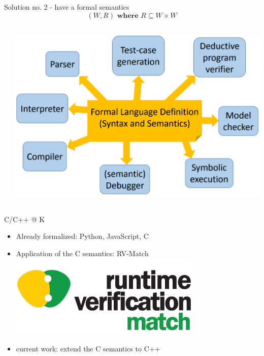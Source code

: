 \documentclass[11pt]{beamer}
\begin{document}
\begin{frame}{Solution no. 2 - have a formal semantics}
\pause
$$ \left( W, R \right) \textbf{ where } R \subseteq W \times W $$
\begin{columns}

\begin{column}{0.5\textwidth}
\end{column}

\begin{column}{0.5\textwidth}
\pause
\includegraphics[width=1.0\linewidth]{img/kidea.png}
\end{column}

\end{columns}
\end{frame}

\begin{frame}{C/C++ @ K}
\begin{itemize}
\item Already formalized: Python, JavaScript, C
\pause \item Application of the C semantics: RV-Match \\
\includegraphics[width=0.3\linewidth]{img/rvmatch.png}
\pause \item current work: extend the C semantics to C++
\end{itemize}
\end{frame}
\end{document}
